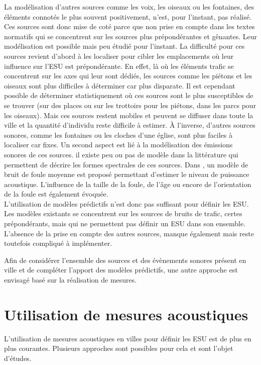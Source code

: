 La modélisation d'autres sources comme les voix, les oiseaux ou les fontaines, des éléments connotés le plus souvent positivement, n'est, pour l'instant, pas réalisé. 
Ces sources sont donc mise de coté parce que non prise en compte dans les textes normatifs qui se concentrent sur les sources plus prépondérantes et gênantes. Leur modélisation est possible mais peu étudié pour l'instant. La difficulté pour ces sources revient d'abord à les localiser pour cibler les emplacements où leur influence sur l'ESU est prépondérante. En effet, là où les éléments trafic se concentrent sur les axes qui leur sont dédiés, les sources comme les piétons et les oiseaux sont plus difficiles à déterminer car plus disparate. Il est cependant possible de déterminer statistiquement où ces sources sont le plus susceptibles de se trouver (sur des places ou sur les trottoirs pour les piétons, dans les parcs pour les oiseaux). Mais ces sources restent mobiles et peuvent se diffuser dans toute la ville et la quantité d'individu reste difficile à estimer. À l'inverse, d'autres sources sonores, comme les fontaines ou les cloches d'une église, sont plus faciles à localiser car fixes. Un second aspect est lié à la modélisation des émissions sonores de ces sources. il existe peu ou pas de modèle dans la littérature qui permettent de décrire les formes spectrales de ces sources. Dans \cite{hayne2011prediction}, un modèle de bruit de foule moyenne est proposé permettant d'estimer le niveau de puissance acoustique. L'influence de la taille de la foule, de l'âge ou encore de l'orientation de la foule est également évoquée. \\


L'utilisation de modèles prédictifs n'est donc pas suffisant pour définir les ESU. Les modèles existants se concentrent sur les sources de bruits de trafic, certes prépondérants, mais qui ne permettent pas définir un ESU dans son ensemble. L'absence de la prise en compte des autres sources, manque également mais reste toutefois compliqué à implémenter. 

Afin de considérer l'ensemble des sources et des évènements sonores présent en ville et de compléter l'apport des modèles prédictifs, une autre approche est envisagé basé sur la réalisation de mesures. 

\section{Utilisation de mesures acoustiques}

L'utilisation de mesures acoustiques en villes pour définir les ESU est de plus en plus courantes. Plusieurs approches sont possibles pour cela et sont l'objet d'études.

